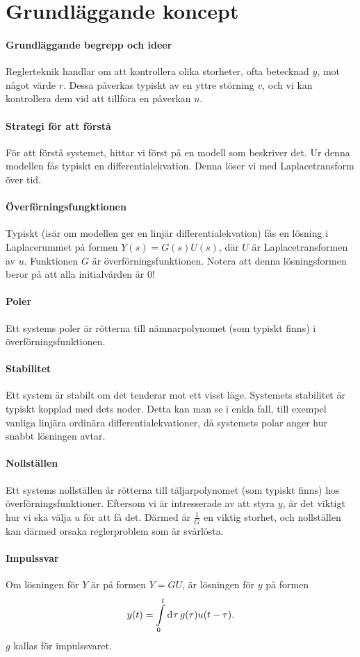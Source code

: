 \section{Grundläggande koncept}

\paragraph{Grundläggande begrepp och ideer}
Reglerteknik handlar om att kontrollera olika storheter, ofta betecknad $y$, mot något värde $r$. Dessa påverkas typiskt av en yttre störning $v$, och vi kan kontrollera dem vid att tillföra en påverkan $u$.

\paragraph{Strategi för att förstå}
För att förstå systemet, hittar vi först på en modell som beskriver det. Ur denna modellen fås typiskt en differentialekvation. Denna löser vi med Laplacetransform över tid.

\paragraph{Överförningsfungktionen}
Typiskt (isär om modellen ger en linjär differentialekvation) fås en lösning i Laplacerummet på formen $Y(s) = G(s)U(s)$, där $U$ är Laplacetransformen av $u$. Funktionen $G$ är överförningsfunktionen. Notera att denna lösningsformen beror på att alla initialvärden är $0$!

\paragraph{Poler}
Ett systems poler är rötterna till nämnarpolynomet (som typiskt finns) i överförningsfunktionen.

\paragraph{Stabilitet}
Ett system är stabilt om det tenderar mot ett visst läge. Systemets stabilitet är typiskt kopplad med dets noder. Detta kan man se i enkla fall, till exempel vanliga linjära ordinära differentialekvationer, då systemets polar anger hur snabbt lösningen avtar.

\paragraph{Nollställen}
Ett systems nollställen är rötterna till täljarpolynomet (som typiskt finns) hos överförningsfunktioner. Eftersom vi är intresserade av att styra $y$, är det viktigt hur vi ska välja $u$ för att få det. Därmed är $\frac{1}{G}$ en viktig storhet, och nollställen kan därmed orsaka reglerproblem som är svårlösta.

\paragraph{Impulssvar}
Om lösningen för $Y$ är på formen $Y = GU$, är lösningen för $y$ på formen
\begin{align*}
	y(t) = \int\limits_{0}^{t}\dd[]{\tau}g(\tau)u(t - \tau).
\end{align*}
$g$ kallas för impulssvaret.
